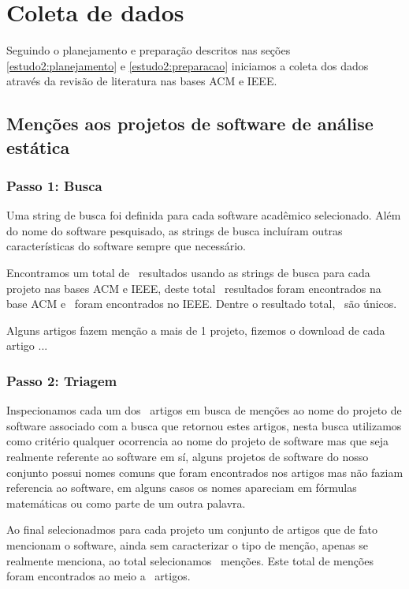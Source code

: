 
\section{Coleta de dados}

Seguindo o planejamento e preparação descritos nas seções
\ref{estudo2:planejamento} e \ref{estudo2:preparacao} iniciamos a coleta dos
dados através da revisão de literatura nas bases ACM e IEEE.

\subsection{Menções aos projetos de software de análise estática}



\subsubsection{Passo 1: Busca}

Uma string de busca foi definida para cada software acadêmico selecionado.
Além do nome do software pesquisado, as strings de busca incluíram outras
características do software sempre que necessário.

Encontramos um total de \SearchCount \ resultados usando as strings de busca
para cada projeto nas bases ACM e IEEE, deste total \SearchACMCount \
resultados foram encontrados na base ACM e \SearchIEEECount \ foram encontrados
no IEEE.  Dentre o resultado total, \SearchUniqueCount \ são únicos.

Alguns artigos fazem menção a mais de 1 projeto, fizemos o download de cada
artigo ...

\subsubsection{Passo 2: Triagem}

Inspecionamos cada um dos \SearchUniqueCount \ artigos em busca de menções ao
nome do projeto de software associado com a busca que retornou estes artigos,
nesta busca utilizamos como critério qualquer ocorrencia ao nome do projeto de
software mas que seja realmente referente ao software em sí, alguns projetos de
software do nosso conjunto possui nomes comuns que foram encontrados nos
artigos mas não faziam referencia ao software, em alguns casos os nomes
apareciam em fórmulas matemáticas ou como parte de um outra palavra.

Ao final selecionadmos para cada projeto um conjunto de artigos que de fato
mencionam o software, ainda sem caracterizar o tipo de menção, apenas se
realmente menciona, ao total selecionamos \ScreeningCount \ menções.
Este total de menções foram encontrados ao meio a \ScreeningUniqueCount \ artigos.

